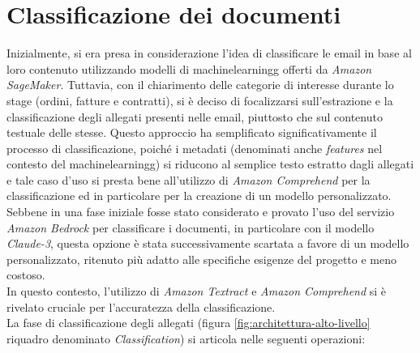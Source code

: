 \section{Classificazione dei documenti}
\label{sec:classificazione-documenti}
Inizialmente, si era presa in considerazione l'idea di classificare le email in base al loro contenuto utilizzando modelli di \gls{machinelearningg} offerti da \emph{Amazon SageMaker}. Tuttavia, con il chiarimento delle categorie di interesse durante lo stage (ordini, fatture e contratti), si è deciso di focalizzarsi sull'estrazione e la classificazione degli allegati presenti nelle email, piuttosto che sul contenuto testuale delle stesse. Questo approccio ha semplificato significativamente il processo di classificazione, poiché i metadati (denominati anche \textit{features} nel contesto del \gls{machinelearningg}) si riducono al semplice testo estratto dagli allegati e tale caso d'uso si presta bene all'utilizzo di \emph{Amazon Comprehend} per la classificazione ed in particolare per la creazione di un modello personalizzato.\\
Sebbene in una fase iniziale fosse stato considerato e provato l'uso del servizio \emph{Amazon Bedrock} per classificare i documenti, in particolare con il modello \emph{Claude-3}, questa opzione è stata successivamente scartata a favore di un modello personalizzato, ritenuto più adatto alle specifiche esigenze del progetto e meno costoso.\\
In questo contesto, l'utilizzo di \emph{Amazon Textract} e \emph{Amazon Comprehend} si è rivelato cruciale per l'accuratezza della classificazione.\\
La fase di classificazione degli allegati (figura \ref{fig:architettura-alto-livello} riquadro denominato \emph{Classification}) si articola nelle seguenti operazioni:

